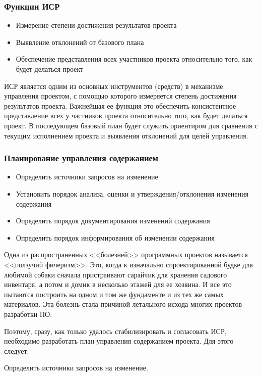 \documentclass{../industrial-development}
\begin{document}
    \begin{frame} \frametitle{Функции ИСР}
        \begin{itemize}
            \item Измерение степени достижения результатов проекта
            \item Выявление отклонений от базового плана
            \item Обеспечение представления всех участников проекта относительно того, как будет делаться проект
        \end{itemize}
    \end{frame}
    \lecturenotes
    ИСР является одним из основных инструментов (средств) в механизме управления проектом, с помощью которого измеряется степень достижения результатов проекта. Важнейшая ее функция это обеспечить консистентное представление всех у частников проекта относительно того, как будет делаться проект. В последующем базовый план будет служить ориентиром для сравнения с текущим исполнением проекта и выявления отклонений для целей управления. 

    \begin{frame} \frametitle{Планирование управления содержанием}
        \begin{itemize}
            \item Определить источники запросов на изменение
            \item Установить порядок анализа, оценки и утверждения/отклонения изменения содержания
            \item Определить порядок документирования изменений содержания
            \item Определить порядок информирования об изменении содержания
        \end{itemize}
    \end{frame}
    \lecturenotes
Одна из распространенных <<болезней>> программных проектов называется <<ползучий фичеризм>>. Это, когда к изначально спроектированной будке для любимой собаки сначала пристраивают сарайчик для хранения садового инвентаря, а потом и домик в несколько этажей для ее хозяина. И все это пытаются построить на одном и том же фундаменте и из тех же самых материалов. Эта болезнь стала причиной летального исхода многих проектов разработки ПО.

Поэтому, сразу, как только удалось стабилизировать и согласовать ИСР, необходимо разработать план управления содержанием проекта. Для этого следует:

Определить источники запросов на изменение.
\end{document}
